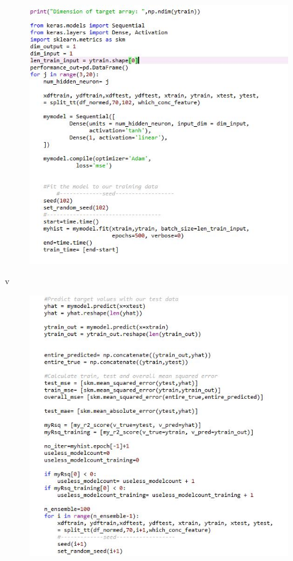 \documentclass[]{article}
\begin{document}
\begin{figure}
\centering
\includegraphics[width=1\textwidth,height=\textheight]{images/mlp2.jpg}
\end{figure}

v

\begin{figure}
\centering
\includegraphics[width=1\textwidth,height=\textheight]{images/mlp3.jpg}
\end{figure}
\end{document}
